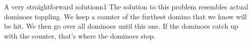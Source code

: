 \documentclass{writeup}
\begin{document}
\begin{solutions}
  \begin{solution}{A very straightforward solution}{n}{1}
    The solution to this problem resembles actual dominoes toppling.
    We keep a counter of the furthest domino that we know will be hit.
    We then go over all dominoes until this one.
    If the dominoes catch up with the counter, that's where the dominoes stop.
  \end{solution}
\end{solutions}
\end{document}
